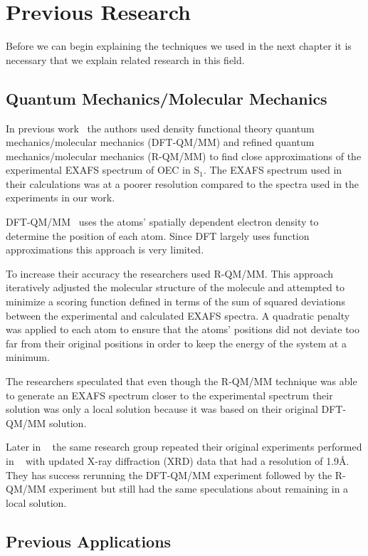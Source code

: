 \chapter{Previous Research}

Before we can begin explaining the techniques we used in the next chapter it is necessary that we explain related research in this field.

\section{Quantum Mechanics/Molecular Mechanics}

In previous work~\cite{sproviero2008model} the authors used density functional theory quantum mechanics/molecular mechanics (DFT-QM/MM) and refined quantum mechanics/molecular mechanics (R-QM/MM) to find close approximations of the experimental EXAFS spectrum of OEC in S$_{1}$. The EXAFS spectrum used in their calculations was at a poorer resolution compared to the spectra used in the experiments in our work.

DFT-QM/MM~\cite{parr1989density} uses the atoms' spatially dependent electron density to determine the position of each atom. Since DFT largely uses function approximations this approach is very limited.

To increase their accuracy the researchers used R-QM/MM. This approach iteratively adjusted the molecular structure of the molecule and attempted to minimize a scoring function defined in terms of the sum of squared deviations between the experimental and calculated EXAFS spectra. A quadratic penalty was applied to each atom to ensure that the atoms' positions did not deviate too far from their original positions in order to keep the energy of the system at a minimum.

The researchers speculated that even though the R-QM/MM technique was able to generate an EXAFS spectrum closer to the experimental spectrum their solution was only a local solution because it was based on their original DFT-QM/MM solution.

Later in ~\cite{luber2011s1} the same research group repeated their original experiments performed in ~\cite{sproviero2008model} with updated X-ray diffraction (XRD) data that had a resolution of 1.9\AA. They has success rerunning the DFT-QM/MM experiment followed by the R-QM/MM experiment but still had the same speculations about remaining in a local solution.

\section{Previous Applications}

